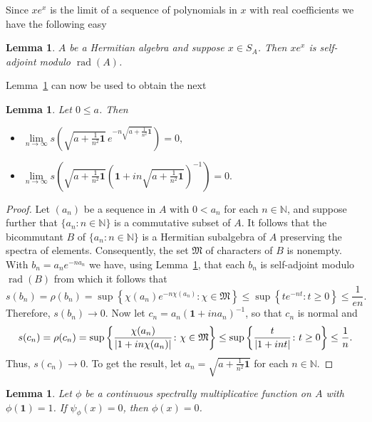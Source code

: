 \documentclass{amsart}
\newtheorem{lemma}[theorem]{Lemma}
\theoremstyle{definition}
\theoremstyle{remark}
\DeclareMathOperator{\rad}{rad} \DeclareMathOperator{\G}{G}
\newcommand{\identity}{\mathbf{1}}
\DeclarePairedDelimiter\abs{\lvert}{\rvert}
\begin{document}
	Since $xe^x$ is the limit of a sequence of polynomials in $x$ with real coefficients we have the following easy 
	\begin{lemma}\label{lem:0}
		$A$ be a Hermitian algebra and suppose $x\in S_A$. Then $xe^x$  is self-adjoint modulo $\rad(A)$. 
	\end{lemma}
	Lemma~\ref{lem:0} can now be used to obtain the next
	\begin{lemma}\label{lem:3}
		Let $0\leq a$. Then 
		\begin{itemize}
		\item[\rm (a)] $\lim\limits_{n\to\infty}s\left(\sqrt{a+\frac{1}{n^2}\mathbf 1}\,e^{-n\sqrt{a+\frac{1}{n^2}\mathbf 1}}\right)=0,$
		\item[\rm (b)]
		$\lim\limits_{n\to\infty}s \left(\sqrt{a+\frac{1}{n^2}\mathbf 1}\left(\identity+in\sqrt{a+\frac{1}{n^2}\mathbf 1}\right)^{-1}\right)=0.$
		\end{itemize}
	\end{lemma}
	\begin{proof}
		Let $(a_n)$ be a sequence in $A$ with $0<a_n$ for each $n\in \mathbb{N}$, and suppose further that $\{a_n\colon n\in \mathbb{N}\}$ is a commutative subset of $A$. It follows that the bicommutant $B$ of $\{a_n\colon n\in \mathbb{N}\}$ is a Hermitian subalgebra of $A$ preserving the spectra of elements. Consequently, the set $\mathfrak{M}$ of characters of $B$ is nonempty. With $b_n=a_ne^{-na_n}$ we have, using Lemma~\ref{lem:0}, that each $b_n$ is self-adjoint modulo $\rad(B)$ from which it follows that
		$$s(b_n)=\rho(b_n)=\sup\left\{\chi(a_n)e^{-n\chi(a_n)}\colon \chi\in\mathfrak{M}\right\}\leq \sup\left\{te^{-nt}\colon t\geq 0\right\}\leq \frac{1}{en}.$$
		Therefore, $s(b_n)\to 0$. Now let $c_n=a_n(\identity+ina_n)^{-1}$, so that $c_n$ is normal and 
		$$s(c_n)=\rho(c_n)=\sup\left\{\frac{\chi(a_n)}{\abs{1+in\chi(a_n)}}\colon \chi\in\mathfrak{M}\right\}\leq \sup\left\{\frac{t}{\abs{1+int}}\colon t\geq 0\right\}\leq \frac{1}{n}.$$
		Thus, $s(c_n)\to 0$. To get the result, let $a_n=\sqrt{a+\frac{1}{n^2}\mathbf 1}$ for each $n\in\mathbb{N}$.
 	\end{proof}
 	
 	\begin{lemma}\label{lem:4}
 		Let $\phi$ be a continuous spectrally multiplicative function on $A$ with $\phi(\identity)=1$. If $\psi_\phi(x)=0$, then $\phi(x)=0$.
 	\end{lemma}
 	
\end{document}
